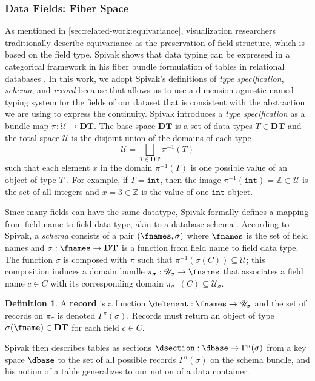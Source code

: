 \documentclass[10pt,journal,compsoc]{IEEEtran}
\theoremstyle{definition}
\newtheorem{definition}{Definition}[section]
\theoremstyle{remark}
\begin{document}
\subsubsection{Data Fields: Fiber Space \dfiber}
\label{sec:atct:fb:fiber}
As mentioned in \autoref{sec:related-work:equivariance}, visualization researchers traditionally describe equivariance as the preservation of field structure, which is based on the field type. Spivak shows that data typing can be expressed in a categorical framework in his fiber bundle formulation of tables in relational databases \cite{spivakDatabasesAreCategories2010,spivakSimplicialDatabases2009}. In this work, we adopt Spivak's definitions of \textit{type specification}, \textit{schema}, and \textit{record} because that allows us to use a dimension agnostic named typing system for the fields of our dataset that is consistent with the abstraction we are using to express the continuity. Spivak introduces a \textit{type specification} as a bundle map $\pi: \mathscr{U} \rightarrow \textbf{DT}$. The base space $\textbf{DT}$ is a set of data types $T \in \textbf{DT}$ and the total space $\mathscr{U}$ is the disjoint union of the domains of each type \[\mathscr{U} = \bigsqcup_{T \in \textbf{DT}} \pi^{-1}(T)\] such that each element $x$ in the domain $\pi^{-1}(T)$ is one possible value of an object of type $T$ \cite{spivakSimplicialDatabases2009}. For example, if $T=\texttt{int}$, then the image $\pi^{-1}(\texttt{int}) = \mathbb{Z} \subset \mathscr{U}$ is the set of all integers and $x=3 \in \mathbb{Z}$ is the value of one $\texttt{int}$ object. 

Since many fields can have the same datatype, Spivak formally defines a mapping from field name to field data type, akin to a database schema \cite{ullmanFirstCourseDatabase2008}. According to Spivak, a \textit{schema} consists of a pair $(\fnames, \sigma)$ where $\fnames$ is the set of field names and $\sigma: \fnames \rightarrow \textbf{DT}$ is a function from field name to field data type\cite{spivakSimplicialDatabases2009}. The function $\sigma$ is composed with $\pi$ such that $\pi^{-1}(\sigma(C)) \subseteq \mathscr{U}$; this composition induces a domain bundle $\pi_{\sigma}:\mathscr{U}_{\sigma} \rightarrow \fnames$ that associates a field name $c \in C$ with its corresponding domain $\pi^{-1}_{\sigma}(C) \subseteq \mathscr{U}_{\sigma}$. 
\begin{definition} A \textbf{record} is a function $\delement: \fnames \rightarrow \mathscr{U}_{\sigma}$ and the set of records on $\pi_{\sigma}$ is denoted $\Gamma^{\pi}(\sigma)$. Records must return an object of type $\sigma(\fname) \in \textbf{DT}$ for each field $c \in C$.
\end{definition}
Spivak then describes tables as sections $\dsection: \dbase \rightarrow \Gamma^{\pi}(\sigma)$ from a key space $\dbase$ to the set of all possible records $\Gamma^{\pi}(\sigma)$ on the schema bundle, and his notion of a table generalizes to our notion of a data container. 
\end{document}
